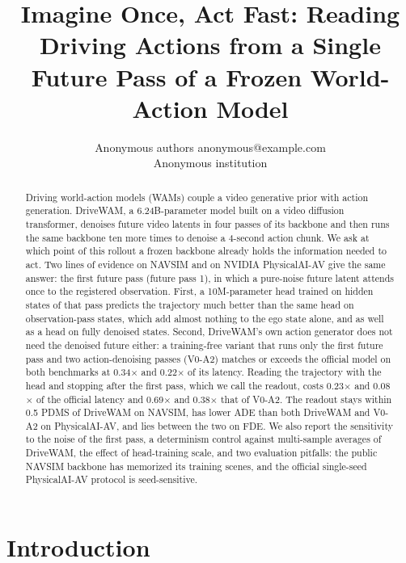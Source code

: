 \documentclass[10pt]{article}
\title{Imagine Once, Act Fast: Reading Driving Actions from a Single Future Pass of a Frozen World-Action Model}
\author{\name Anonymous authors \email anonymous@example.com \\
      \addr Anonymous institution}
\newcommand{\VA}[2]{V#1-A#2}
\begin{document}
\maketitle

\begin{abstract}
Driving world-action models (WAMs) couple a video generative prior with action generation. DriveWAM, a 6.24B-parameter model built on a video diffusion transformer, denoises future video latents in four passes of its backbone and then runs the same backbone ten more times to denoise a 4-second action chunk. We ask at which point of this rollout a frozen backbone already holds the information needed to act. Two lines of evidence on NAVSIM and on NVIDIA PhysicalAI-AV give the same answer: the first future pass (future pass 1), in which a pure-noise future latent attends once to the registered observation. First, a 10M-parameter head trained on hidden states of that pass predicts the trajectory much better than the same head on observation-pass states, which add almost nothing to the ego state alone, and as well as a head on fully denoised states. Second, DriveWAM's own action generator does not need the denoised future either: a training-free variant that runs only the first future pass and two action-denoising passes (\VA{0}{2}) matches or exceeds the official model on both benchmarks at 0.34$\times$ and 0.22$\times$ of its latency. Reading the trajectory with the head and stopping after the first pass, which we call the readout, costs 0.23$\times$ and 0.08$\times$ of the official latency and 0.69$\times$ and 0.38$\times$ that of \VA{0}{2}. The readout stays within 0.5 PDMS of DriveWAM on NAVSIM, has lower ADE than both DriveWAM and \VA{0}{2} on PhysicalAI-AV, and lies between the two on FDE. We also report the sensitivity to the noise of the first pass, a determinism control against multi-sample averages of DriveWAM, the effect of head-training scale, and two evaluation pitfalls: the public NAVSIM backbone has memorized its training scenes, and the official single-seed PhysicalAI-AV protocol is seed-sensitive.
\end{abstract}

\section{Introduction}
\label{sec:intro}
\end{document}
